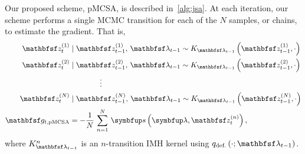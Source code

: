 \begin{proofEnd}

  Our proposed scheme, pMCSA, is described in~\cref{alg:jsa}. 
  At each iteration, our scheme performs a single MCMC transition for each of the \(N\) samples, or chains, to estimate the gradient.
  That is,
  \begin{align*}
    \rvvz^{(1)}_{t} &\mid \rvvz_{t-1}^{(1)},\, \rvvlambda_{t-1} \sim K_{\rvvlambda_{t-1}}\left(\rvvz_{t-1}^{(1)}, \cdot\right) \\
    \rvvz^{(2)}_{t} &\mid \rvvz_{t-1}^{(2)},\, \rvvlambda_{t-1}  \sim K_{\rvvlambda_{t-1}}\left(\rvvz_{t-1}^{(2)}, \cdot\right) \\
    &\qquad\qquad\vdots
    \\
    \rvvz^{(N)}_{t} &\mid \rvvz^{(N)}_{t-1},\, \rvvlambda_{t-1}  \sim K_{\rvvlambda_{t-1}}\left(\rvvz_{t-1}^{(N)}, \cdot\right)
    \\
    \rvvg_{t,\text{pMCSA}} &= -\frac{1}{N}\,\sum^{N}_{n=1} \, \vs\left(\vlambda, \rvvz^{(n)}_t\right),
  \end{align*}
  where \(K_{\rvvlambda_{t-1}}^n\) is an \(n\)-transition IMH kernel using \(q_{\text{def.}}\left(\cdot; \rvvlambda_{t-1}\right)\).


\end{proofEnd}
